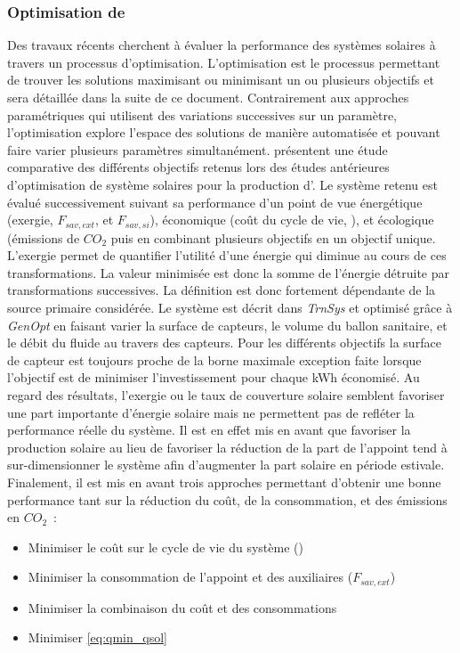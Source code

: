 \subsubsection{Optimisation de } %
\label{ssub:optimisation_de_ssc}
Des travaux récents cherchent à évaluer la performance des systèmes solaires à travers
un processus d’optimisation. L’optimisation est le processus permettant de trouver les
solutions maximisant ou minimisant un ou plusieurs objectifs et sera détaillée dans la
suite de ce document. Contrairement aux approches paramétriques qui utilisent des variations
successives sur un paramètre, l’optimisation explore l’espace des solutions de manière automatisée
et pouvant faire varier plusieurs paramètres simultanément. \textcite{Fraisse2009232} présentent
une étude comparative des différents objectifs retenus lors des études antérieures
d’optimisation de système solaires pour la production d’. Le système retenu est
évalué successivement suivant sa performance d’un point de vue énergétique (exergie,
$F_{sav, ext}$, et $F_{sav, si}$), économique (coût du cycle de vie, ), et
écologique (émissions de $CO_{2}$ puis en combinant plusieurs objectifs en un objectif
unique. L’exergie permet de quantifier l’utilité d’une énergie qui diminue au cours de ces transformations. La
valeur minimisée est donc la somme de l’énergie détruite par transformations successives. La définition est donc fortement dépendante de la source primaire considérée.
Le système est décrit dans \textit{TrnSys} et optimisé grâce à
\textit{GenOpt} en faisant varier la surface de capteurs, le volume du ballon sanitaire,
et le débit du fluide au travers des capteurs. Pour les différents objectifs la surface de
capteur est toujours proche de la borne maximale exception faite lorsque l’objectif est de
minimiser l’investissement pour chaque
\si{kWh} économisé. Au regard des résultats, l’exergie ou le taux de couverture solaire
semblent favoriser une part importante d’énergie solaire mais ne permettent pas de refléter
la performance réelle du système. Il est en effet mis en avant que favoriser la production
solaire au lieu de favoriser la réduction de la part de l’appoint tend à sur-dimensionner
le système afin d’augmenter la part solaire en période estivale. Finalement, il est mis en
avant trois approches permettant d’obtenir une  bonne performance tant sur la réduction du
coût, de la consommation, et des émissions en $CO_{2}$~:
\begin{itemize}
    \item Minimiser le coût sur le cycle de vie du système ()
    \item Minimiser la consommation de l’appoint et des auxiliaires ($F_{sav, ext}$)
    \item Minimiser la combinaison du coût et des consommations
    \item Minimiser \eqref{eq:qmin_qsol}
\end{itemize}

